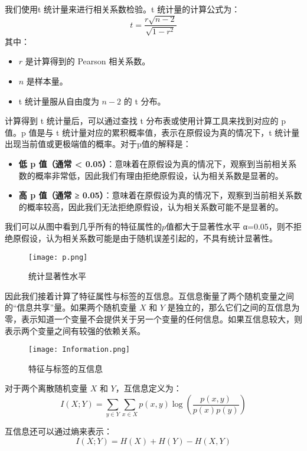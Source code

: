 我们使用t 统计量来进行相关系数检验。t 统计量的计算公式为：
\begin{equation}
t = \frac{r \sqrt{n - 2}}{\sqrt{1 - r^2}}
\label{eq:t}
\end{equation}
其中：
\begin{itemize}
    \item \(r\) 是计算得到的 Pearson 相关系数。
    \item \(n\) 是样本量。
    \item t 统计量服从自由度为 \(n - 2\) 的 t 分布。
\end{itemize}
计算得到 t 统计量后，可以通过查找 t 分布表或使用计算工具来找到对应的 p 值。p 值是与 t 统计量对应的累积概率值，表示在原假设为真的情况下，t 统计量出现当前值或更极端值的概率。对于p值的解释是：
\begin{itemize}
    \item \textbf{低 p 值（通常 < 0.05）}：意味着在原假设为真的情况下，观察到当前相关系数的概率非常低，因此我们有理由拒绝原假设，认为相关系数是显著的。
    \item \textbf{高 p 值（通常 ≥ 0.05）}：意味着在原假设为真的情况下，观察到当前相关系数的概率较高，因此我们无法拒绝原假设，认为相关系数可能不是显著的。
\end{itemize}
我们可以从图中看到几乎所有的特征属性的$p$值都大于显著性水平 
α=0.05，则不拒绝原假设，认为相关系数可能是由于随机误差引起的，不具有统计显著性。
\begin{figure}[H]
    \centering
    \texttt{[image: p.png]}
    \caption{统计显著性水平}
    \label{fig:enter-label}
\end{figure}
 
  
  因此我们接着计算了特征属性与标签的互信息。互信息衡量了两个随机变量之间的“信息共享”量。如果两个随机变量 $X$ 和 
$Y$ 是独立的，那么它们之间的互信息为零，表示知道一个变量不会提供关于另一个变量的任何信息。如果互信息较大，则表示两个变量之间有较强的依赖关系。
 \begin{figure}[H]
      \centering
      \texttt{[image: Information.png]}
      \caption{特征与标签的互信息}
      \label{fig:enter-label}
  \end{figure}
对于两个离散随机变量 \(X\) 和 \(Y\)，互信息定义为：
\begin{equation}
I(X; Y) = \sum_{y \in Y} \sum_{x \in X} p(x, y) \log \left(\frac{p(x, y)}{p(x) p(y)}\right)
\label{eq:mutual_information}
\end{equation}

互信息还可以通过熵来表示：
\begin{equation}
I(X; Y) = H(X) + H(Y) - H(X, Y)
\label{eq:mutual_information_entropy}
\end{equation}


